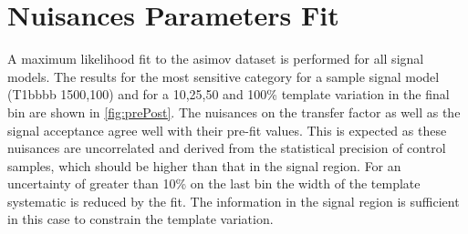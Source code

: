 \clearpage
\section{Nuisances Parameters Fit\label{app:prePostFit}}

A maximum likelihood fit to the asimov dataset is performed for all signal models. 
The results for the most sensitive category for a sample signal model (T1bbbb 1500,100) and for 
a 10,25,50 and 100\% template variation in the final bin are shown in \ref{fig:prePost}. 
The nuisances on the transfer factor as well as the signal acceptance agree 
well with their pre-fit values. This is expected as these nuisances are uncorrelated 
and derived from the statistical precision of control samples, which should be
higher than that in the signal region. For an uncertainty of greater than 10\%
on the last bin the width of the template systematic is reduced by the fit.
The information in the signal region is sufficient in this case
to constrain the template variation. 


